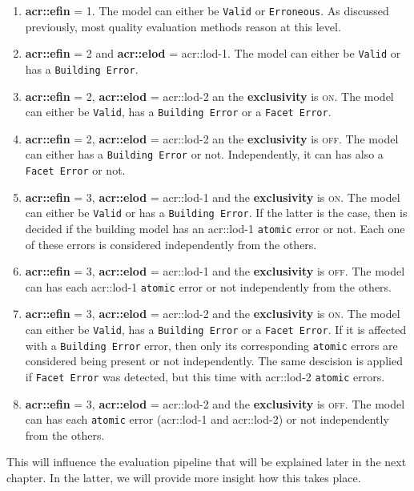         \begin{enumerate}
            \item \textbf{\gls{acr::efin}} = 1.
                    The model can either be \texttt{Valid} or \texttt{Erroneous}.
                    As discussed previously, most quality evaluation methods reason at this level.
            \item \textbf{\gls{acr::efin}} = 2 and \textbf{\gls{acr::elod}} = \gls{acr::lod}-1.
                    The model can either be \texttt{Valid} or has a \texttt{Building Error}.
            \item \textbf{\gls{acr::efin}} = 2, \textbf{\gls{acr::elod}} = \gls{acr::lod}-2 an the \textbf{exclusivity} is \textsc{on}.
                    The model can either be \texttt{Valid}, has a \texttt{Building Error} or a \texttt{Facet Error}.
            \item \textbf{\gls{acr::efin}} = 2, \textbf{\gls{acr::elod}} = \gls{acr::lod}-2 an the \textbf{exclusivity} is \textsc{off}.
                    The model can either has a \texttt{Building Error} or not.
                    Independently, it can has also a \texttt{Facet Error} or not.
            \item \textbf{\gls{acr::efin}} = 3, \textbf{\gls{acr::elod}} = \gls{acr::lod}-1 and the \textbf{exclusivity} is \textsc{on}.
                    The model can either be \texttt{Valid} or has a \texttt{Building Error}.
                    If the latter is the case, then is decided if the building model has an \gls{acr::lod}-1 \texttt{atomic} error or not.
                    Each one of these errors is considered independently from the others.
            \item \textbf{\gls{acr::efin}} = 3, \textbf{\gls{acr::elod}} = \gls{acr::lod}-1 and the \textbf{exclusivity} is \textsc{off}.
                    The model can has each \gls{acr::lod}-1 \texttt{atomic} error or not independently from the others.
            \item \textbf{\gls{acr::efin}} = 3, \textbf{\gls{acr::elod}} = \gls{acr::lod}-2 and the \textbf{exclusivity} is \textsc{on}.
                    The model can either be \texttt{Valid}, has a \texttt{Building Error} or a \texttt{Facet Error}.
                    If it is affected with a \texttt{Building Error} error, then only its corresponding \texttt{atomic} errors are considered being present or not independently.
                    The same descision is applied if \texttt{Facet Error} was detected, but this time with \gls{acr::lod}-2 \texttt{atomic} errors.
            \item \textbf{\gls{acr::efin}} = 3, \textbf{\gls{acr::elod}} = \gls{acr::lod}-2 and the \textbf{exclusivity} is \textsc{off}.
                    The model can has each \texttt{atomic} error (\gls{acr::lod}-1 and \gls{acr::lod}-2) or not independently from the others.
        \end{enumerate}

        This will influence the evaluation pipeline that will be explained later in the next chapter.
        In the latter, we will provide more insight how this takes place.
